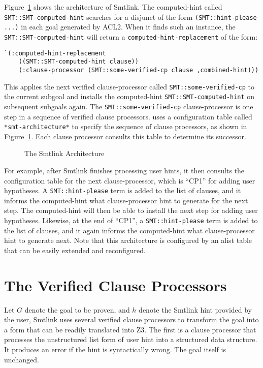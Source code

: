 Figure~\ref{fig:arch} shows the architecture of Smtlink.
The computed-hint called \\
\texttt{SMT::SMT-computed-hint} searches for a disjunct of the form
\texttt{(SMT::hint-please ...)} in each goal generated by ACL2.
When it finds such an instance, the \texttt{SMT::SMT-computed-hint}
will return a \texttt{computed-hint-replacement} of the form:
\begin{lstlisting}[style=codestyle]
  `(:computed-hint-replacement
    ((SMT::SMT-computed-hint clause))
    (:clause-processor (SMT::some-verified-cp clause ,combined-hint)))
\end{lstlisting}
This applies the next verified clause-processor called
\texttt{SMT::some-verified-cp} to the current subgoal and installs the
computed-hint \texttt{SMT::SMT-computed-hint} on subsequent subgoals again.
The \texttt{SMT::some-verified-cp} clause-processor is one step in a sequence of
verified clause processors.
\smtlink{} uses a configuration table called \texttt{*smt-architecture*} to
specify the sequence of clause processors, as shown in Figure~\ref{fig:arch}.
Each clause processor consults this table to determine its successor.

\begin{figure}\begin{center}
  \resizebox{1.0\textwidth}{!}{}
  \caption{The Smtlink Architecture}\label{fig:arch}
\end{center}\end{figure}

For example, after Smtlink finishes processing user hints, it then consults the
configuration table for the next clause-processor, which is ``CP1'' for adding
user hypotheses.
A \texttt{SMT::hint-please} term is added to the list of clauses, and it informs
the computed-hint what clause-processor hint to generate for the next step.
The computed-hint will then be able to install the next step for adding user
hypotheses. Likewise, at the end of ``CP1'', a \texttt{SMT::hint-please} term is
added to the list of clauses, and it again informs the computed-hint what
clause-processor hint to generate next.
Note that this architecture is configured by an alist table that can be easily
extended and reconfigured.

\section{The Verified Clause Processors}
Let $G$ denote the goal to be proven, and $h$ denote the Smtlink hint provided
by the user, Smtlink uses several verified clause processors to transform the
goal into a form that can be readily translated into Z3. The first is a clause
processor that processes the unstructured list form of user hint into a
structured data structure. It produces an error if the hint is syntactically
wrong. The goal itself is unchanged.

